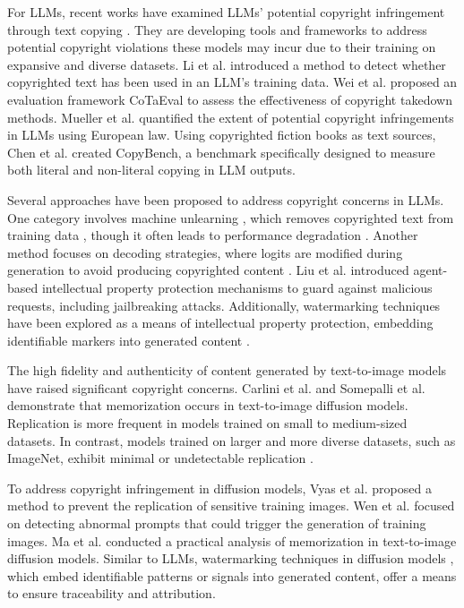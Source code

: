 For LLMs, recent works have examined LLMs' potential copyright infringement through text copying \cite{chang2023speak,karamolegkou2023copyright, schwarzschild2024rethinking, hacohen2024not}. They are developing tools and frameworks to address potential copyright violations these models may incur due to their training on expansive and diverse datasets. Li et al. \cite{li2024digger} introduced a method to detect whether copyrighted text has been used in an LLM's training data. Wei et al. \cite{wei2024evaluating} proposed an evaluation framework CoTaEval to assess the effectiveness of copyright takedown methods. Mueller et al. \cite{mueller2024llms} quantified the extent of potential copyright infringements in LLMs using European law. Using copyrighted fiction books as text sources, Chen et al. \cite{chen2024copybench} created CopyBench, a benchmark specifically designed to measure both literal and non-literal copying in LLM outputs. 

Several approaches have been proposed to address copyright concerns in LLMs. One category involves machine unlearning \cite{zhuang2024uoe, yang2024cliperase, liu2024rethinking}, which removes copyrighted text from training data \cite{liu2024rethinking,yao2023large,hans2024like}, though it often leads to performance degradation \cite{min2023silo}. Another method focuses on decoding strategies, where logits are modified during generation to avoid producing copyrighted content \cite{ippolito2023preventing,xu2024safedecoding}. Liu et al. \cite{liu2024shield} introduced agent-based intellectual property protection mechanisms to guard against malicious requests, including jailbreaking attacks. Additionally, watermarking techniques have been explored as a means of intellectual property protection, embedding identifiable markers into generated content \cite{kirchenbauer2023watermark,zhang2024remark,wang2023towards,pan2024markllm,li2024double}.

The high fidelity and authenticity of content generated by text-to-image models have raised significant copyright concerns. Carlini et al. \cite{carlini2023extracting} and Somepalli et al. \cite{somepalli2023diffusion, somepalli2023understanding} demonstrate that memorization occurs in text-to-image diffusion models. Replication is more frequent in models trained on small to medium-sized datasets. In contrast, models trained on larger and more diverse datasets, such as ImageNet, exhibit minimal or undetectable replication \cite{somepalli2023diffusion}.
 
To address copyright infringement in diffusion models, Vyas et al. \cite{vyas2023provable} proposed a method to prevent the replication of sensitive training images. Wen et al. \cite{wen2024detecting} focused on detecting abnormal prompts that could trigger the generation of training images. Ma et al. \cite{ma2024could} conducted a practical analysis of memorization in text-to-image diffusion models. Similar to LLMs, watermarking techniques in diffusion models \cite{cui2023diffusionshield, zhao2023recipe, cui2023ft, fernandez2023stable, lei2024diffusetrace, xiong2023flexible}, which embed identifiable patterns or signals into generated content, offer a means to ensure traceability and attribution.

